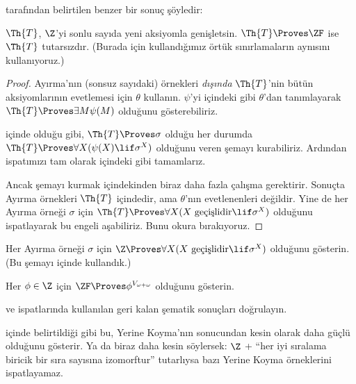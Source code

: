 \documentclass[../../../include/open-logic-section]{subfiles}
\begin{document}
\citet[223]{Potter2004} tarafından belirtilen benzer bir sonuç şöyledir:

\begin{prop}
	$\Th{T}$, $\Z$'yi sonlu sayıda yeni aksiyomla genişletsin.
	$\Th{T} \Proves \ZF$ ise $\Th{T}$ tutarsızdır. (Burada
	 için kullandığımız örtük sınırlamaların aynısını
	kullanıyoruz.)
\end{prop}
\begin{proof}
	Ayırma'nın (sonsuz sayıdaki) örnekleri \emph{dışında} $\Th{T}$'nin bütün
	aksiyomlarının evetlemesi için $\theta$ kullanın. $\psi$'yi
	 içindeki gibi $\theta$'dan tanımlayarak
	$\Th{T} \Proves \exists M \psi(M)$ olduğunu gösterebiliriz.
	
	 içinde olduğu gibi, $\Th{T} \Proves \sigma$ olduğu
	her durumda $\Th{T} \Proves \forall X(\psi(X) \lif \sigma^X)$ olduğunu
	veren şemayı kurabiliriz. Ardından ispatımızı tam olarak
	 içindeki gibi tamamlarız.
	
	Ancak şemayı kurmak  içindekinden biraz daha fazla
	çalışma gerektirir. Sonuçta Ayırma örnekleri $\Th{T}$ içindedir, ama
	$\theta$'nın evetlenenleri değildir. Yine de her Ayırma örneği
	$\sigma$ için $\Th{T} \Proves \forall X(X\text{ geçişlidir} \lif
	\sigma^X)$ olduğunu ispatlayarak bu engeli aşabiliriz. Bunu okura
	bırakıyoruz.
\end{proof}
\begin{prob}
	Her Ayırma örneği $\sigma$ için $\Z \Proves \forall X(X\text{ geçişlidir}
	\lif \sigma^X)$ olduğunu gösterin. (Bu şemayı
	içinde kullandık.)
\end{prob}
\begin{prob}
	Her $\phi \in \Z$ için $\ZF \Proves \phi^{V_{\omega+\omega}}$ olduğunu
	gösterin.
\end{prob}
\begin{prob}
	 ve
	ispatlarında kullanılan geri kalan şematik sonuçları doğrulayın.
\end{prob}

 içinde belirtildiği gibi bu, Yerine
Koyma'nın  sonucundan
kesin olarak daha güçlü olduğunu gösterir. Ya da biraz daha kesin söylersek:
$\Z$ + ``her iyi sıralama biricik bir sıra sayısına izomorftur'' tutarlıysa
bazı Yerine Koyma örneklerini ispatlayamaz.


\end{document}
